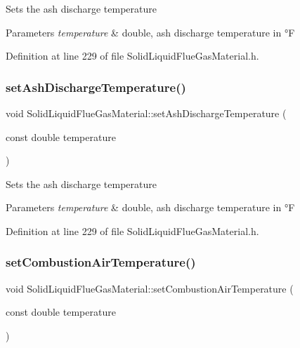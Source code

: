 Sets the ash discharge temperature 
\begin{DoxyParams}{Parameters}
{\em temperature} & double, ash discharge temperature in °F \\
\hline
\end{DoxyParams}


Definition at line 229 of file Solid\+Liquid\+Flue\+Gas\+Material.\+h.

\mbox{\label{class_solid_liquid_flue_gas_material_ad29543a88737c3d051c7d824287bc791}} 
\subsubsection{\texorpdfstring{set\+Ash\+Discharge\+Temperature()}{setAshDischargeTemperature()}\hspace{0.1cm}{\footnotesize\ttfamily [3/3]}}
{\footnotesize\ttfamily void Solid\+Liquid\+Flue\+Gas\+Material\+::set\+Ash\+Discharge\+Temperature (\begin{DoxyParamCaption}\item[{const double}]{temperature }\end{DoxyParamCaption})\hspace{0.3cm}{\ttfamily [inline]}}

Sets the ash discharge temperature 
\begin{DoxyParams}{Parameters}
{\em temperature} & double, ash discharge temperature in °F \\
\hline
\end{DoxyParams}


Definition at line 229 of file Solid\+Liquid\+Flue\+Gas\+Material.\+h.

\mbox{\label{class_solid_liquid_flue_gas_material_a626dfbc9ba87abff99e5c5a8204d69c6}} 
\subsubsection{\texorpdfstring{set\+Combustion\+Air\+Temperature()}{setCombustionAirTemperature()}\hspace{0.1cm}{\footnotesize\ttfamily [1/3]}}
{\footnotesize\ttfamily void Solid\+Liquid\+Flue\+Gas\+Material\+::set\+Combustion\+Air\+Temperature (\begin{DoxyParamCaption}\item[{const double}]{temperature }\end{DoxyParamCaption})\hspace{0.3cm}{\ttfamily [inline]}}

